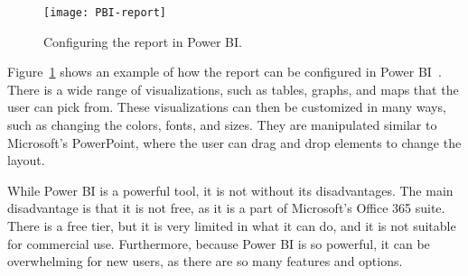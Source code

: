 \begin{figure}[H]
    \centering
    \texttt{[image: PBI-report]}
    \caption{Configuring the report in Power BI.\@
    }\label{fig:PBI-report}
\end{figure}

Figure~\ref{fig:PBI-report} shows an example of how the report can be configured in Power BI~\cite{power-bi}.
There is a wide range of visualizations, such as tables, graphs, and maps that the user can pick from.
These visualizations can then be customized in many ways, such as changing the colors, fonts, and sizes.
They are manipulated similar to Microsoft's PowerPoint, where the user can drag and drop elements to change the layout.

While Power BI is a powerful tool, it is not without its disadvantages.
The main disadvantage is that it is not free, as it is a part of Microsoft's Office 365 suite.
There is a free tier, but it is very limited in what it can do, and it is not suitable for commercial use.
Furthermore, because Power BI is so powerful, it can be overwhelming for new users, as there are so many features and
options.
